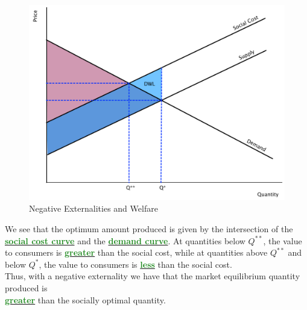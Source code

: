 \documentclass[11pt]{article}\usepackage[]{graphicx}\usepackage[]{color}
\theoremstyle{definition}
\newcommand{\dd}[1]{{\underline{\textbf{\textcolor{ForestGreen}{#1}}}}}
\begin{document}
	\begin{figure}[H]
	\centering
	\includegraphics[scale=.4]{plot51.pdf}
	\caption{Negative Externalities and Welfare}
	\end{figure}

	
	We see that the optimum amount produced is given by the intersection of the \dd{social cost curve} and the \dd{demand curve}. At quantities below $Q^{**}$, the value to consumers is \dd{greater} than the social cost, while at quantities above $Q^{**}$ and below $Q^*$, the value to consumers is \dd{less} than the social cost.
	\\
	
	Thus, with a negative externality we have that the market equilibrium quantity produced is 
	\\
	\dd{greater} than the socially optimal quantity. 
	\\
	
\end{document}
